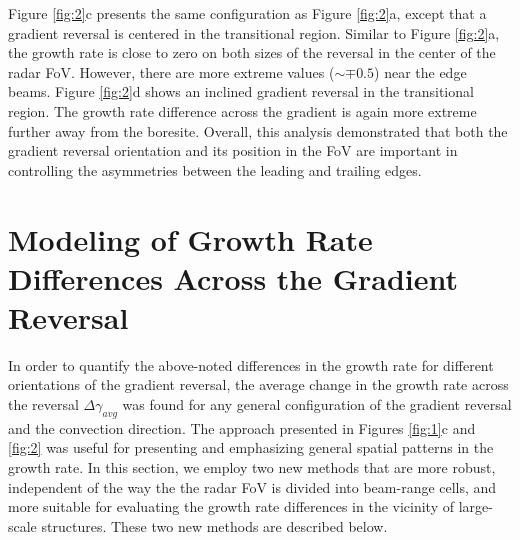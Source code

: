 Figure \ref{fig:2}c presents the same configuration as Figure \ref{fig:2}a, except that a gradient reversal is centered in the transitional region. Similar to Figure \ref{fig:2}a, the growth rate is close to zero on both sizes of the reversal in the center of the radar FoV.  However, there are more extreme values (\(\sim\mp0.5\)) near the edge beams.  Figure \ref{fig:2}d shows an inclined gradient reversal in the transitional region.  The growth rate difference across the gradient is again more extreme further away from the boresite. Overall, this analysis demonstrated that both the gradient reversal orientation and its position in the FoV are important in controlling the asymmetries between the leading and trailing edges.

\section{Modeling of Growth Rate Differences Across the Gradient Reversal}
\label{sec:model_reversal}
In order to quantify the above-noted differences in the growth rate for different orientations of the gradient reversal, the average change in the growth rate across the reversal \(\Delta\gamma_{avg}\) was found for any general configuration of the gradient reversal and the convection direction. The approach presented in Figures \ref{fig:1}c and \ref{fig:2} was useful for presenting and emphasizing general spatial patterns in the growth rate. In this section, we employ two new methods that are more robust, independent of the way the the radar FoV is divided into beam-range cells, and more suitable for evaluating the growth rate differences in the vicinity of large-scale structures. These two new methods are described below.




